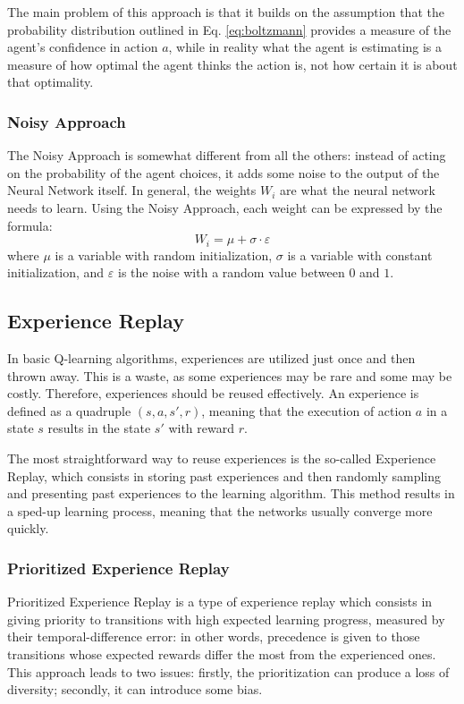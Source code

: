 \documentclass[a4paper, 12pt]{article}
\numberwithin{equation}{section}
\begin{document}
The main problem of this approach is that it builds on the assumption that the probability distribution outlined in Eq. \eqref{eq:boltzmann} provides a measure of the agent's confidence in action $a$, while in reality what the agent is estimating is a measure of how optimal the agent thinks the action is, not how certain it is about that optimality.



\subsubsection[Noisy Approach]{Noisy Approach \cite{deep-reinforcement}}

The Noisy Approach is somewhat different from all the others: instead of acting on the probability of the agent choices, it adds some noise to the output of the Neural Network itself. In general, the weights $W_i$ are what the neural network needs to learn. Using the Noisy Approach, each weight can be expressed by the formula:
\begin{equation}
	W_i = \mu+\sigma\cdot\varepsilon
\end{equation}
where $\mu$ is a variable with random initialization, $\sigma$ is a variable with constant initialization, and $\varepsilon$ is the noise with a random value between $0$ and $1$.


\subsection[Experience Replay]{Experience Replay \cite{experience-replay}}

In basic Q-learning algorithms, experiences are utilized just once and then thrown away. This is a waste, as some experiences may be rare and some may be costly. Therefore, experiences should be reused effectively. An experience is defined as a quadruple $\left(s,a,s',r\right)$, meaning that the execution of action $a$ in a state $s$ results in the state $s'$ with reward $r$.

The most straightforward way to reuse experiences is the so-called Experience Replay, which consists in storing past experiences and then randomly sampling and presenting past experiences to the learning algorithm. This method results in a sped-up learning process, meaning that the networks usually converge more quickly.


\subsubsection[Prioritized Experience Replay]{Prioritized Experience Replay \cite{prioritized-experience-replay}}
Prioritized Experience Replay is a type of experience replay which consists in giving priority to transitions with high expected learning progress, measured by their temporal-difference error: in other words, precedence is given to those transitions whose expected rewards differ the most from the experienced ones. This approach leads to two issues: firstly, the prioritization can produce a loss of diversity; secondly, it can introduce some bias.
\end{document}
